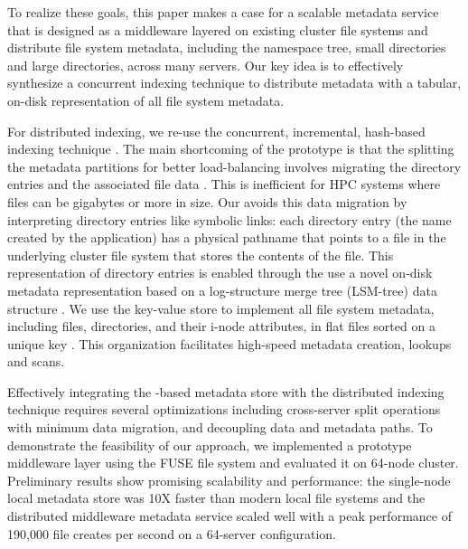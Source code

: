  
To realize these goals, this paper makes a case for a scalable metadata service 
that is designed as a middleware layered on existing cluster file systems and 
distribute file system metadata, including the namespace tree, small 
directories and large directories, across many servers.
Our key idea is to effectively synthesize a concurrent indexing 
technique to distribute metadata with a tabular, on-disk representation of all
file system metadata. 

For distributed indexing, we re-use the concurrent, incremental, hash-based
\giga{} indexing technique \citep{GIGA11}.
The main shortcoming of the \giga{} prototype is that the splitting
the metadata partitions for better load-balancing involves migrating the
directory entries and the associated file data \citep{GIGA11}.
This is inefficient for HPC systems where files can be gigabytes or more in
size. Our \giga{} avoids this data migration by interpreting directory entries
like symbolic links: each directory entry (the name created by the
application) has a physical pathname that points to a file in the underlying
cluster file system that stores the contents of the file.
This representation of directory entries is enabled through the use a novel
on-disk metadata representation based on a log-structure merge tree (LSM-tree)
data structure \citep{ONeil1996}.
We use the \ldb{} key-value store to implement all file system metadata, including 
files, directories, and their i-node attributes, in flat files sorted on a
unique key \citep{LevelDB}.
This organization facilitates high-speed metadata creation, lookups and scans.

Effectively integrating the \ldb-based metadata store with the distributed indexing
technique requires several optimizations including cross-server split operations 
with minimum data migration, and decoupling data and metadata paths.
To demonstrate the feasibility of our approach, we implemented a prototype middleware layer
using the FUSE file system and evaluated it on 64-node cluster. Preliminary
results show promising scalability and performance: the single-node local metadata 
store was 10X faster than modern local file systems and the distributed
middleware metadata service scaled well with a peak performance of 190,000 file creates per second 
on a 64-server configuration. 


